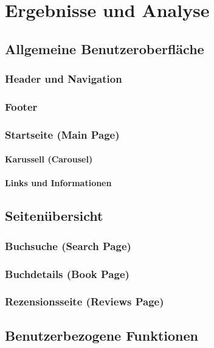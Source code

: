 \chapter{Ergebnisse und Analyse}

\section{Allgemeine Benutzeroberfläche}

\subsection{Header und Navigation}

\subsection{Footer}

\subsection{Startseite (Main Page)}

\subsubsection{Karussell (Carousel)}

\subsubsection{Links und Informationen}

\section{Seitenübersicht}

\subsection{Buchsuche (Search Page)}

\subsection{Buchdetails (Book Page)}

\subsection{Rezensionsseite (Reviews Page)}

\section{Benutzerbezogene Funktionen}

